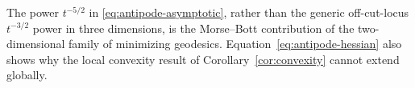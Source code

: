 The power $t^{-5/2}$ in \eqref{eq:antipode-asymptotic}, rather than the
generic off-cut-locus $t^{-3/2}$ power in three dimensions, is the
Morse--Bott contribution of the two-dimensional family of minimizing
geodesics.  Equation~\eqref{eq:antipode-hessian} also shows why the local
convexity result of Corollary~\ref{cor:convexity} cannot extend globally.
